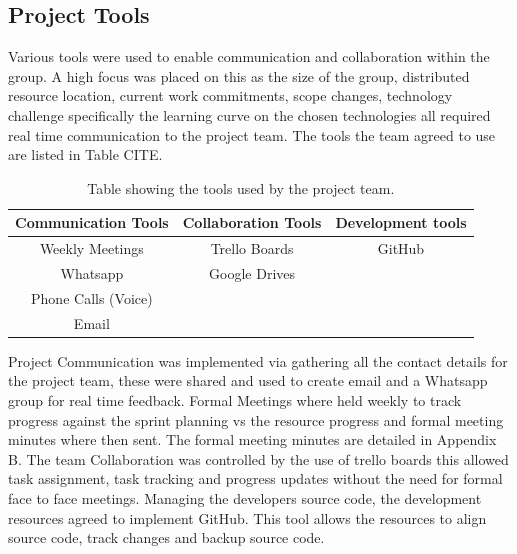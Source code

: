 \documentclass[12pt]{witseiepaper}
\begin{document}
\subsection{Project Tools}
Various tools were used to enable communication and collaboration within the
group. A high focus was placed on this as the size of the group, distributed resource location, current work commitments, scope changes, technology challenge specifically the learning curve on the chosen technologies all required real time communication to the project team. The tools the team agreed to use are listed in Table CITE.

\begin{table}[htb] \caption{Table showing the tools used by the project team.} \label{tbl:Tools} 
	\begin{center}
		\begin{tabular}
			{|c|c|c|} %
			\hline Communication Tools & Collaboration Tools & Development tools \\
			\hline Weekly Meetings &  Trello Boards & GitHub\\
			\hline Whatsapp & Google Drives &\\
			\hline Phone Calls (Voice) &&\\
			\hline Email &&\\
			\hline 
		\end{tabular}
	\end{center}
\end{table}

Project Communication was implemented via gathering all the contact details for the project team, these were shared and used to create email and a Whatsapp group for real time feedback. Formal Meetings where held weekly to track progress against the sprint planning vs the resource progress and formal meeting minutes where then sent. The formal meeting minutes are detailed in Appendix B. The team Collaboration was controlled by the use of trello boards \cite{Trello} this allowed task assignment, task tracking and progress updates without the need for formal face to face meetings. Managing the developers source code, the development resources agreed to implement GitHub.\cite{GitHubRef} This tool allows the resources to align source code, track changes and backup source code. 
\end{document}
